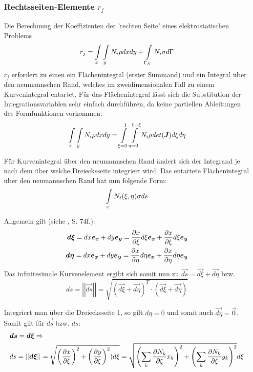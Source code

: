 \subsubsection{Rechtsseiten-Elemente $r_j$}
Die Berechnung der Koeffizienten der 'rechten Seite' eines elektrostatischen Problems 
\begin{equation}
r_j = \int\displaylimits_{x} \int\displaylimits_{y} N_i \rho dx dy + \int\displaylimits_{\Gamma_N} N_i\sigma d\Gamma
\end{equation}$r_j$
erfordert zu einen ein Flächenintegral (erster Summand) und ein Integral über den neumannschen Rand, welches im zweidimensionalen Fall zu einem Kurvenintegral entartet. \newline
Für das Flächenintegral lässt sich die Substitution der Integrationsvariablen sehr einfach durchführen, da keine partiellen Ableitungen des Formfunktionen vorkommen:
\begin{equation}
\int\displaylimits_{x} \int\displaylimits_{y} N_i \rho dx dy = \int\displaylimits_{\xi = 0}^{1} \int\displaylimits_{\eta = 0}^{1 - \xi} N_i \rho \mathit{det} (\boldsymbol{J}) d\xi d\eta
\end{equation}
\newline

Für Kurvenintegral über den neumannschen Rand ändert sich der Integrand je nach dem über welche Dreiecksseite integriert wird. 
Das entartete Flächenintegral über den neumannschen Rand hat nun folgende Form:
\begin{equation}
	\int\displaylimits_{c}N_i(\xi, \eta)\sigma ds
\end{equation}

Allgemein gilt (siehe \cite{SMS_VO_skript}, S. 74f.):
\begin{align}
\label{eq:subs}
\boldsymbol{d\xi} = dx\boldsymbol{e_x} + dy\boldsymbol{e_y} = \frac{\partial x}{\partial \xi}d\xi \boldsymbol{e_x} + \frac{\partial x}{\partial \xi} d\xi \boldsymbol{e_y}\\
\boldsymbol{d\eta} = dx\boldsymbol{e_x} + dy\boldsymbol{e_y} = \frac{\partial x}{\partial \eta}d\eta \boldsymbol{e_x} + \frac{\partial x}{\partial \eta} d\eta \boldsymbol{e_y} \nonumber
\end{align}
Das infinitesimale Kurvenelement ergibt sich somit nun zu $\vec{ds} = \vec{d\xi} + \vec{d\eta}$ bzw. \begin{equation}
\label{eq:ds_abs}
ds = \left|\left| \vec{ds} \right|\right| = \sqrt{\left(\vec{d\xi} + \vec{d\eta}\right)^T\cdot \left( \vec{d\xi} + \vec{d\eta} \right)}
\end{equation}\newline

Integriert man über die Dreiecksseite 1, so gilt $d\eta = 0$ und somit auch $\vec{d\eta} = \vec{0}$.
Somit gilt für $\vec{ds}$ bzw. $ds$:
\begin{align}
	&\boldsymbol{ds} =  \boldsymbol{d\xi} \Rightarrow \nonumber \\
	&ds = \left|\left| \boldsymbol{d\xi} \right|\right| = \sqrt{ \left(\frac{\partial x}{\partial \xi}\right)^2 + \left(\frac{\partial y}{\partial \xi}\right)^2) d\xi} = \sqrt{ \left( \sum\limits_{k}\frac{\partial N_k}{\partial \xi}x_k \right)^2  + \left( \sum\limits_{k}\frac{\partial N_k}{\partial \xi}y_k \right)^2 } d\xi
\end{align}

